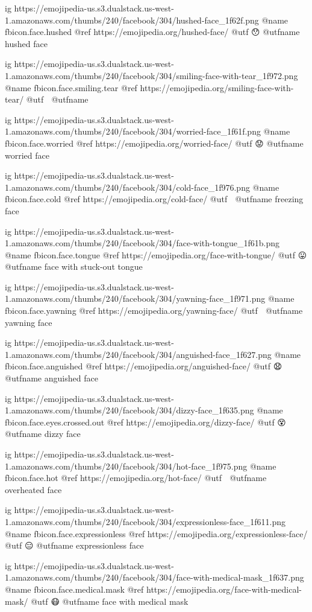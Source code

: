 	ig https://emojipedia-us.s3.dualstack.us-west-1.amazonaws.com/thumbs/240/facebook/304/hushed-face_1f62f.png
	@name fbicon.face.hushed
	@ref https://emojipedia.org/hushed-face/
	@utf 😯
	@utfname hushed face

	ig https://emojipedia-us.s3.dualstack.us-west-1.amazonaws.com/thumbs/240/facebook/304/smiling-face-with-tear_1f972.png
	@name fbicon.face.smiling.tear
	@ref https://emojipedia.org/smiling-face-with-tear/
	@utf 🥲
	@utfname

	ig https://emojipedia-us.s3.dualstack.us-west-1.amazonaws.com/thumbs/240/facebook/304/worried-face_1f61f.png
	@name fbicon.face.worried
	@ref https://emojipedia.org/worried-face/
	@utf 😟
	@utfname worried face

	ig https://emojipedia-us.s3.dualstack.us-west-1.amazonaws.com/thumbs/240/facebook/304/cold-face_1f976.png
	@name fbicon.face.cold
	@ref https://emojipedia.org/cold-face/
	@utf 🥶
	@utfname freezing face

	ig https://emojipedia-us.s3.dualstack.us-west-1.amazonaws.com/thumbs/240/facebook/304/face-with-tongue_1f61b.png
	@name fbicon.face.tongue
	@ref https://emojipedia.org/face-with-tongue/
	@utf 😛
	@utfname face with stuck-out tongue

	ig https://emojipedia-us.s3.dualstack.us-west-1.amazonaws.com/thumbs/240/facebook/304/yawning-face_1f971.png
	@name fbicon.face.yawning
	@ref https://emojipedia.org/yawning-face/
	@utf 🥱
	@utfname yawning face

	ig https://emojipedia-us.s3.dualstack.us-west-1.amazonaws.com/thumbs/240/facebook/304/anguished-face_1f627.png
	@name fbicon.face.anguished
	@ref https://emojipedia.org/anguished-face/
	@utf 😧
	@utfname anguished face

	ig https://emojipedia-us.s3.dualstack.us-west-1.amazonaws.com/thumbs/240/facebook/304/dizzy-face_1f635.png
	@name fbicon.face.eyes.crossed.out
	@ref https://emojipedia.org/dizzy-face/
	@utf 😵
	@utfname dizzy face

	ig https://emojipedia-us.s3.dualstack.us-west-1.amazonaws.com/thumbs/240/facebook/304/hot-face_1f975.png
	@name fbicon.face.hot
	@ref https://emojipedia.org/hot-face/
	@utf 🥵
	@utfname overheated face

	ig https://emojipedia-us.s3.dualstack.us-west-1.amazonaws.com/thumbs/240/facebook/304/expressionless-face_1f611.png
	@name fbicon.face.expressionless
	@ref https://emojipedia.org/expressionless-face/
	@utf 😑
	@utfname expressionless face

	ig https://emojipedia-us.s3.dualstack.us-west-1.amazonaws.com/thumbs/240/facebook/304/face-with-medical-mask_1f637.png
	@name fbicon.face.medical.mask
	@ref https://emojipedia.org/face-with-medical-mask/
	@utf 😷
	@utfname face with medical mask

